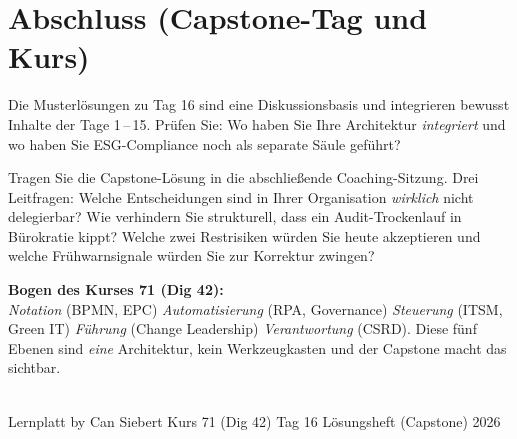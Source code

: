 \documentclass[11pt,a4paper,oneside]{article}
\begin{document}
\clearpage

\section*{Abschluss (Capstone-Tag und Kurs)}
\thispagestyle{plain}

\noindent Die Musterl\"osungen zu Tag 16 sind eine Diskussionsbasis und integrieren bewusst Inhalte der Tage 1\,--\,15. Pr\"ufen Sie: Wo haben Sie Ihre Architektur \emph{integriert} \textendash{} und wo haben Sie ESG-Compliance noch als separate S\"aule gef\"uhrt?

\medskip
\begin{infobox}
Tragen Sie die Capstone-L\"osung in die abschlie{\ss}ende Coaching-Sitzung. Drei Leitfragen: Welche Entscheidungen sind in Ihrer Organisation \emph{wirklich} nicht delegierbar? Wie verhindern Sie strukturell, dass ein Audit-Trockenlauf in B\"urokratie kippt? Welche zwei Restrisiken w\"urden Sie heute akzeptieren \textendash{} und welche Fr\"uhwarnsignale w\"urden Sie zur Korrektur zwingen?
\end{infobox}

\medskip
\noindent\textbf{Bogen des Kurses 71 (Dig 42):}\\
\emph{Notation} (BPMN, EPC) \textrightarrow{} \emph{Automatisierung} (RPA, Governance) \textrightarrow{} \emph{Steuerung} (ITSM, Green IT) \textrightarrow{} \emph{F\"uhrung} (Change Leadership) \textrightarrow{} \emph{Verantwortung} (CSRD). Diese f\"unf Ebenen sind \emph{eine} Architektur, kein Werkzeugkasten \textendash{} und der Capstone macht das sichtbar.

\vspace{1cm}
\noindent{\color{lpAccent}\rule{\linewidth}{0.6pt}}\\[4pt]
{\footnotesize\sffamily\color{lpGray}Lernplatt \textperiodcentered{} by Can Siebert \textperiodcentered{} Kurs 71 (Dig 42) \textperiodcentered{} Tag 16 \textperiodcentered{} L\"osungsheft (Capstone) \textperiodcentered{} \textcopyright{} 2026}
\end{document}
